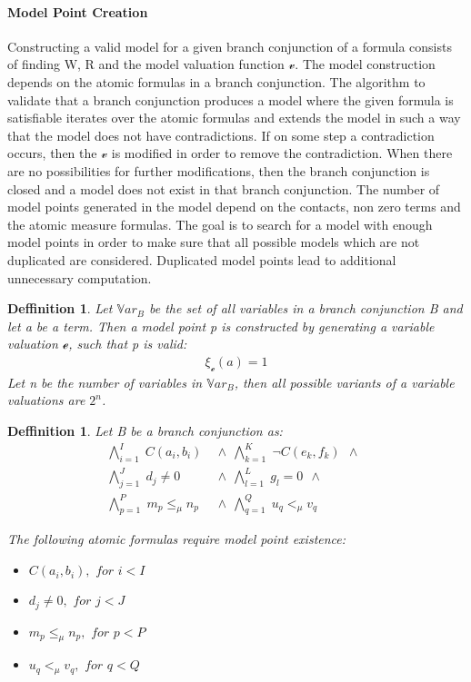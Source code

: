 \documentclass{article}
\newtheorem{defn}[theorem]{Deffinition}
\newcommand{\curvedE}{\mathscr{e}}
\newcommand{\Var}{\mathbb{V}ar}
\newcommand{\vE}{\mathscr{v}}
\newcommand{\vBool}{\xi}
\newcommand{\BranchConjunction}{%
\begin{align*}
			\bigwedge_{i=1}^{I} \; C(a_i, b_i) \:\: & \wedge \:\: 
			\bigwedge_{k=1}^{K} \; \neg C(e_k, f_k) \:\: \wedge \:\: \\
			\bigwedge_{j=1}^{J} \; d_j \neq 0 \:\: & \wedge \:\:
			\bigwedge_{l=1}^{L} \; g_l = 0 \:\: \wedge \:\:\\
			\bigwedge_{p=1}^{P} \; m_p \le_\mu n_p \:\: &\wedge \:\:
			\bigwedge_{q=1}^{Q} \; u_q <_\mu v_q \:\:
\end{align*}%
}
\begin{document}
	\paragraph{Model Point Creation}
		Constructing a valid model for a given branch conjunction of a formula consists of finding W, R and the model valuation function $\vE$.
		The model construction depends on the atomic formulas in a branch conjunction. 
		The algorithm to validate that a branch conjunction produces a model where the given formula is satisfiable iterates over the atomic formulas and extends the model in such a way that the model does not have contradictions.
		If on some step a contradiction occurs, then the $\vE$ is modified in order to remove the contradiction.
		When there are no possibilities for further modifications, then the branch conjunction is closed and a model does not exist in that branch conjunction.
		The number of model points generated in the model depend on the contacts, non zero terms and the atomic measure formulas.
		The goal is to search for a model with enough model points in order to make sure that all possible models which are not duplicated are considered.
		Duplicated model points lead to additional unnecessary computation. 

	\begin{defn}
		Let $\Var_B$ be the set of all variables in a branch conjunction B and let a be a term.
		Then a model point p is constructed by generating a variable valuation $\curvedE$, such that p is valid:
		\begin{align*}
			\vBool_{\curvedE}(a) = 1
		\end{align*}
		Let n be the number of variables in $\Var_B$, then all possible variants of a variable valuations are $2^n$.
	\end{defn}

	\begin{defn}
		Let B be a branch conjunction as:
		\BranchConjunction
		The following atomic formulas require model point existence:
		\begin{itemize}
			\item $C(a_i, b_i), \textit{ for } i < I$
			\item $d_j \neq 0, \textit{ for } j < J$
			\item $m_p \le_\mu n_p, \textit{ for } p < P$
			\item $u_q <_\mu v_q, \textit{ for } q < Q$
		\end{itemize}
	\end{defn}
\end{document}
